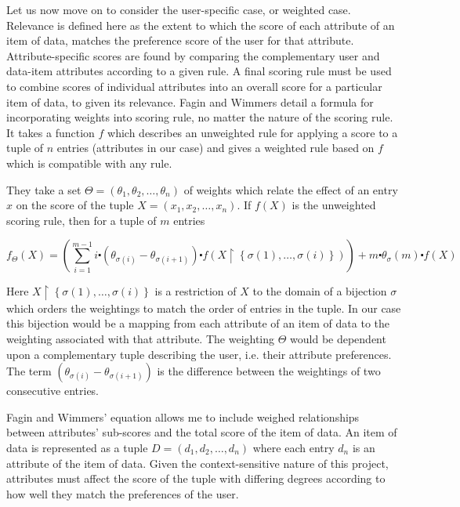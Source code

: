 Let us now move on to consider the user-specific case, or weighted case. Relevance is defined here as the extent to which the score of each attribute of an item of data, matches the preference score of the user for that attribute. Attribute-specific scores are found by comparing the complementary user and data-item attributes according to a given rule. A final scoring rule must be used to combine scores of individual attributes into an overall score for a particular item of data, to given its relevance.
Fagin and Wimmers \cite{FaginWimmers1} detail a formula for incorporating weights into scoring rule, no matter the nature of the scoring rule. It takes a function $f$ which describes an unweighted rule for applying a score to a tuple of $n$ entries (attributes in our case) and gives a weighted rule based on $f$ which is compatible with any rule. 

They take a set $\Theta = (\theta_1,\theta_2,\dotsc,\theta_n)$ of weights which relate the effect of an entry $x$ on the score of the tuple $ X = (x_1, x_2, \dots, x_n)$. If $f(X)$ is the unweighted scoring rule, then for a tuple of $m$ entries

\begin{equation}\label{WeightedRule}	
	f_\Theta (X) = \left(\sum_{i=1}^{m-1} i\centerdot (\theta_{\sigma{(i)}} - \theta_{\sigma{(i+1)}})\centerdot f(X\upharpoonright\left\{\sigma(1),\dots,\sigma(i)\right\})\right) + m \centerdot \theta_\sigma{(m)} \centerdot f(X)
\end{equation}

Here $X\upharpoonright\left\{\sigma(1),\dots,\sigma(i)\right\}$ is a restriction of $X$ to the domain of a bijection $\sigma$ which orders the weightings to match the order of entries in the tuple. In our case this bijection would be a mapping from each attribute of an item of data to the weighting associated with that attribute. The weighting $\Theta$ would be dependent upon a complementary tuple describing the user, i.e. their attribute preferences. The term $(\theta_{\sigma{(i)}} - \theta_{\sigma{(i+1)}})$ is the difference between the weightings of two consecutive entries. 

Fagin and Wimmers' equation allows me to include weighed relationships between attributes' sub-scores and the total score of the item of data. An item of data is represented as a tuple $ D = (d_1, d_2, \dots, d_n)$ where each entry $d_n$ is an attribute of the item of data. Given the context-sensitive nature of this project, attributes must affect the score of the tuple with differing degrees according to how well they match the preferences of the user. 

